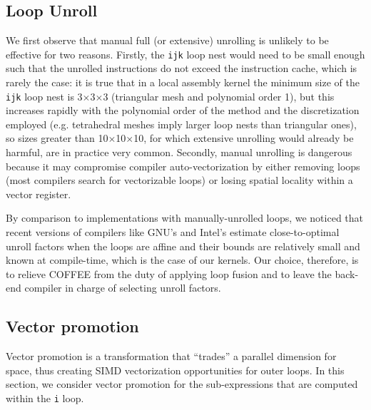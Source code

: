 \subsection{Loop Unroll}
We first observe that manual full (or extensive) unrolling is unlikely to be effective for two reasons. Firstly, the \texttt{ijk} loop nest would need to be small enough such that the unrolled instructions do not exceed the instruction cache, which is rarely the case: it is true that in a local assembly kernel the minimum size of the \texttt{ijk} loop nest is 3$\times$3$\times$3 (triangular mesh and polynomial order 1), but this increases rapidly with the polynomial order of the method and the discretization employed (e.g. tetrahedral meshes imply larger loop nests than triangular ones), so sizes greater than 10$\times$10$\times$10, for which extensive unrolling would already be harmful, are in practice very common. Secondly, manual unrolling is dangerous because it may compromise compiler auto-vectorization by either removing loops (most compilers search for vectorizable loops) or losing spatial locality within a vector register.

By comparison to implementations with manually-unrolled loops, we noticed that recent versions of compilers like GNU's and Intel's estimate close-to-optimal unroll factors when the loops are affine and their bounds are relatively small and known at compile-time, which is the case of our kernels. Our choice, therefore, is to relieve COFFEE from the duty of applying loop fusion and to leave the back-end compiler in charge of selecting unroll factors.

\subsection{Vector promotion}
\label{sec:coffee-precompute}
Vector promotion is a transformation that ``trades'' a parallel dimension for space, thus creating SIMD vectorization opportunities for outer loops. In this section, we consider vector promotion for the sub-expressions that are computed within the {\tt i} loop. 

